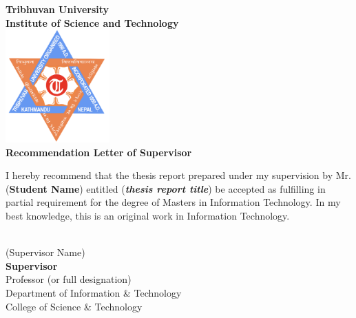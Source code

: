 \documentclass[a4paper,12pt]{report}
\begin{document}
\newpage
\thispagestyle{empty}     %
\begin{center}
    \onehalfspacing
    \large
   \textbf{\Huge Tribhuvan University}\\
    \textbf{\Large Institute of Science and Technology}\\
    \vspace{1cm}
    \includegraphics[width=0.3\textwidth]{Pictures/TU Logo.png} \\
    \vspace{1cm}
    \textbf{Recommendation Letter of Supervisor} \\
    \vspace{2cm}
\end{center}

\noindent
I hereby recommend that the thesis report prepared under my supervision by Mr. (\textbf{Student Name}) entitled (\textbf{\textit{thesis report title}}) be accepted as fulfilling in partial requirement for the degree of Masters in Information Technology. In my best knowledge, this is an original work in Information Technology.

\vspace{6cm}

\noindent
\begin{tabbing}
    \makebox[8cm]{\dotfill} \\
    (Supervisor Name) \\
    \textbf{Supervisor} \\
    Professor (or full designation) \\
    Department of Information \& Technology \\
    College of Science \& Technology\\
    
\end{tabbing}
\end{document}

